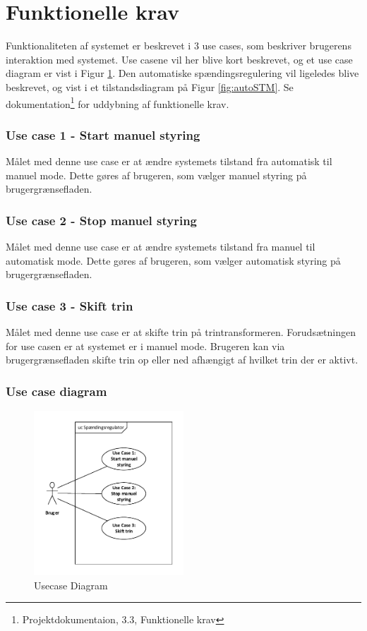 
\section{Funktionelle krav}

Funktionaliteten af systemet er beskrevet i 3 use cases, som beskriver brugerens interaktion med systemet. Use casene vil her blive kort beskrevet, og et use case diagram er vist i Figur \ref{fig:UsecaseDiagram}.
 Den automatiske spændingsregulering vil ligeledes blive beskrevet, og vist i et tilstandsdiagram på Figur \ref{fig:autoSTM}.
  Se dokumentation\footnote{Projektdokumentaion, 3.3, Funktionelle krav} for uddybning af funktionelle krav. 

\subsubsection{Use case 1 - Start manuel styring}
Målet med denne use case er at ændre systemets tilstand fra automatisk til manuel mode. Dette gøres af brugeren, som vælger manuel styring på brugergrænsefladen. 

\subsubsection{Use case 2 - Stop manuel styring}
Målet med denne use case er at ændre systemets tilstand fra manuel til automatisk mode. Dette gøres af brugeren, som vælger automatisk styring på brugergrænsefladen. 

\subsubsection{Use case 3 - Skift trin}
Målet med denne use case er at skifte trin på trintransformeren. Forudsætningen for use casen er at systemet er i manuel mode. Brugeren kan via brugergrænsefladen skifte trin op eller ned afhængigt af hvilket trin der er aktivt. 

\subsubsection{Use case diagram}
\begin{figure}[H] %
	\centering
	\includegraphics[width=0.5\textwidth]{figure/UsecaseDiagram}
	\caption{Usecase Diagram}
	\label{fig:UsecaseDiagram}
\end{figure}

